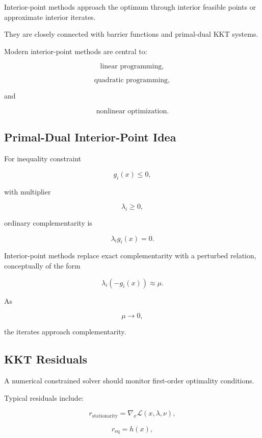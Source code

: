 Interior-point methods approach the optimum through interior feasible
points or approximate interior iterates.

They are closely connected with barrier functions and primal-dual KKT
systems.

Modern interior-point methods are central to:

\[
\boxed{
\text{linear programming},
}
\]

\[
\boxed{
\text{quadratic programming},
}
\]

and

\[
\boxed{
\text{nonlinear optimization}.
}
\]

\subsection{Primal-Dual Interior-Point Idea}
\label{subsec:primal-dual-interior-point}

For inequality constraint

\[
g_i(x)\leq0,
\]

with multiplier

\[
\lambda_i\geq0,
\]

ordinary complementarity is

\[
\boxed{
\lambda_i
g_i(x)
=
0.
}
\]

Interior-point methods replace exact complementarity with a perturbed
relation, conceptually of the form

\[
\boxed{
\lambda_i
(
-g_i(x)
)
\approx
\mu.
}
\]

As

\[
\mu\to0,
\]

the iterates approach complementarity.

\subsection{KKT Residuals}
\label{subsec:numerical-kkt-residuals}

A numerical constrained solver should monitor first-order optimality
conditions.

Typical residuals include:

\[
\boxed{
r_{\mathrm{stationarity}}
=
\nabla_x
\mathcal{L}(x,\lambda,\nu),
}
\]

\[
\boxed{
r_{\mathrm{eq}}
=
h(x),
}
\]

